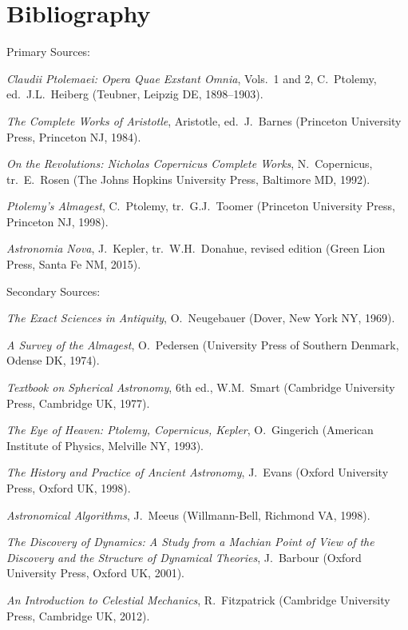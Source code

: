 \chapter*{Bibliography}

\begin{raggedright}
{\large Primary Sources:}
\end{raggedright}
\begin{description}
\item {\em Claudii Ptolemaei: Opera Quae Exstant Omnia}, Vols.~1 and 2, C.~Ptolemy, ed.\ J.L.~Heiberg (Teubner, Leipzig DE, 1898--1903). 
\item {\em The Complete Works of Aristotle}, Aristotle, ed.\ J.~Barnes (Princeton University Press, Princeton NJ, 1984).
\item {\em On the Revolutions: Nicholas Copernicus Complete Works},
N.~Copernicus, tr.\ E.~Rosen (The Johns Hopkins University Press, Baltimore MD, 1992).
\item {\em Ptolemy's Almagest}, C.~Ptolemy, tr.\ G.J.~Toomer (Princeton University Press, Princeton NJ, 1998).
\item {\em Astronomia Nova}, J.~Kepler, tr.\ W.H.~Donahue, revised edition (Green Lion Press,  Santa Fe NM, 2015). 
\end{description}
\begin{raggedright}
{\large Secondary Sources:}
\end{raggedright}
\begin{description}
\item {\em The Exact Sciences in Antiquity}, O.~Neugebauer (Dover, New York NY, 1969).
\item {\em A Survey of the Almagest}, O.~Pedersen (University Press of Southern Denmark,  Odense DK, 1974).
\item {\em Textbook on Spherical Astronomy}, 6th ed., W.M.~Smart  (Cambridge University Press, Cambridge UK, 1977).
\item {\em The Eye of Heaven: Ptolemy, Copernicus, Kepler}, O.~Gingerich
(American Institute of Physics, Melville NY, 1993).
\item {\em The History and Practice of Ancient Astronomy}, J.~Evans (Oxford University Press, Oxford UK, 1998). 
\item {\em Astronomical Algorithms}, J.~Meeus (Willmann-Bell, Richmond VA, 1998).
\item {\em The Discovery of Dynamics: A Study from a Machian Point of View of the Discovery and the Structure of Dynamical Theories},
J.~Barbour (Oxford University Press, Oxford UK, 2001).
\item{\em An Introduction to Celestial Mechanics}, R.~Fitzpatrick (Cambridge University Press, Cambridge UK, 2012).
\end{description}
